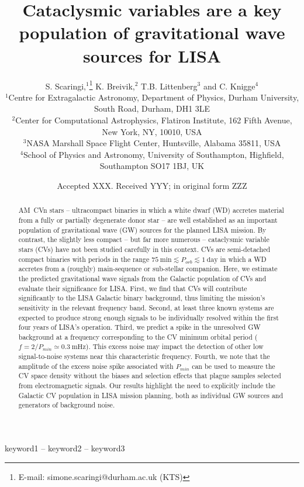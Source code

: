 \documentclass[fleqn,usenatbib]{mnras}
\title[LISA CVs]{Cataclysmic variables are a key population of gravitational wave sources for LISA}
\author[S. Scaringi et al.]{
S. Scaringi,$^{1}$\thanks{E-mail: simone.scaringi@durham.ac.uk (KTS)}
K. Breivik,$^{2}$
T.B. Littenberg$^{3}$
and C. Knigge$^{4}$
\\
$^{1}$Centre for Extragalactic Astronomy, Department of Physics, Durham University, South Road, Durham, DH1 3LE\\
$^{2}$Center for Computational Astrophysics, Flatiron Institute, 162 Fifth Avenue, New York, NY, 10010, USA\\
$^{3}$NASA Marshall Space Flight Center, Huntsville, Alabama 35811, USA\\
$^{4}$School of Physics and Astronomy, University of Southampton, Highfield, Southampton SO17 1BJ, UK
}
\date{Accepted XXX. Received YYY; in original form ZZZ}
\begin{document}
\label{firstpage}
\pagerange{\pageref{firstpage}--\pageref{lastpage}}
\maketitle

\begin{abstract}
AM~CVn stars -- ultracompact binaries in which a white dwarf (WD) accretes material from a fully or partially degenerate donor star -- are well established as an important population of gravitational wave (GW) sources for the planned LISA mission. By contrast, the slightly less compact -- but far more numerous -- cataclysmic variable stars (CVs) have not been studied carefully in this context.  CVs are semi-detached compact binaries with periods in the range $75~\mathrm{min} \lesssim P_{orb} \lesssim 1~\mathrm{day}$ in which a WD accretes from a (roughly) main-sequence or sub-stellar companion. Here, we estimate the predicted gravitational wave signals from the Galactic population of CVs and evaluate their significance for LISA. First, we find that CVs will contribute significantly to the LISA Galactic binary background, thus limiting the mission's sensitivity in the relevant frequency band. Second, at least three known systems are expected to produce strong enough signals to be individually resolved within the first four years of LISA's operation. Third, we predict a spike in the unresolved GW background at a frequency corresponding to the CV minimum orbital period ($f = 2/P_{min} \simeq 0.3~\mathrm{mHz}$). 
This excess noise may impact the detection of other low signal-to-noise systems near this characteristic frequency. Fourth, we note that the amplitude of the excess noise spike associated with $P_{min}$ can be used to measure the CV space density without the biases and selection effects that plague samples selected from  electromagnetic signals. Our results highlight the need to explicitly include the Galactic CV population in LISA mission planning, both as individual GW sources and generators of background noise. 
\end{abstract}


\begin{keywords}
keyword1 -- keyword2 -- keyword3
\end{keywords}


\end{document}

